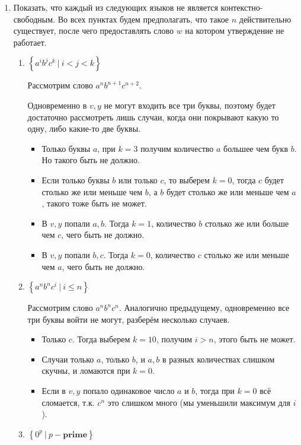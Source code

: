 \documentclass[fleqn]{article}
\begin{document}
\begin{enumerate}

\item Показать, что каждый из следующих языков не является контекстно-свободным. Во всех пунктах будем 
предполагать, что такое $n$ действительно существует, после чего предоставлять слово $w$ на котором утверждение не 
работает.
	\begin{enumerate}
		\item $\left\{ a^ib^jc^k   \ | \ i < j < k \right\}$
		
		Рассмотрим слово $a^n b^{n + 1} c^{n + 2}$.
		
		Одновременно в $v, y$ не могут входить все три буквы, поэтому будет достаточно рассмотреть лишь случаи, когда 
		они покрывают какую то одну, либо какие-то две буквы.
		
		\begin{itemize}
			\item Только буквы $a$, при $k = 3$ получим количество $a$ большее чем букв $b$. Но такого быть не должно.
			\item Если только буквы $b$ или только $c$, то выберем $k = 0$, тогда $c$ будет столько же или меньше чем 
			$b$, а $b$ будет столько же или меньше чем $a$, такого тоже быть не может.
			\item В $v, y$ попали $a, b$. Тогда $k = 1$, количество $b$ столько же или больше чем $c$, чего быть не должно.
			\item В $v, y$ попали $b, c$. Тогда $k = 0$, количество $c$ столько же или меньше чем $a$, чего быть не должно.
		\end{itemize}
		\item $\left\{ a^nb^nc^i   \ | \ i \leq n \right\}$
		
		Рассмотрим слово $a^n b^n c^n$.
		Аналогично предыдущему, одновременно все три буквы войти не могут, разберём несколько случаев.
		\begin{itemize}
			\item Только $c$. Тогда выберем $k = 10$, получим $i > n$, этого быть не может.
			\item Случаи только $a$, только $b$, и $a, b$ в разных количествах слишком скучны, и ломаются при $k = 0$.
			\item Если в $v, y$ попало одинаковое число $a$ и $b$, тогда при $k = 0$ всё сломается, т.к. $c^n$ это 
			слишком много (мы уменьшили максимум для $i$).
		\end{itemize}
		
		
		\item $\left\{ 0^p         \ | \ p - \mathbf{prime} \right\}$
		

\end{enumerate}
\end{enumerate}
\end{document}
